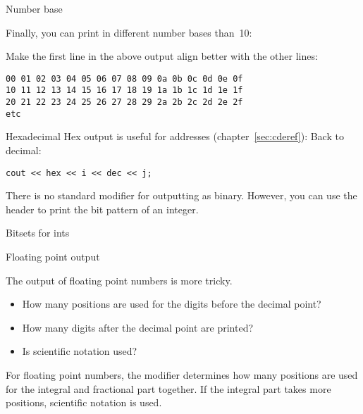 \begin{block}{Number base}
  \label{sl:io-base}
  \advance\textwidth -2in 

  Finally, you can print in different number bases than~10:

  \def\snippetcodefraction{.4}
  \def\snippetanswfraction{.6}
  \def\codesize{\ttfamily\tiny}
  \def\verbsize{\ttfamily\tiny}

\end{block}

\begin{exercise}
  \label{ex:leadzero}
  Make the first line in the above output align better with the other lines:
\begin{verbatim}
00 01 02 03 04 05 06 07 08 09 0a 0b 0c 0d 0e 0f 
10 11 12 13 14 15 16 17 18 19 1a 1b 1c 1d 1e 1f 
20 21 22 23 24 25 26 27 28 29 2a 2b 2c 2d 2e 2f 
etc
\end{verbatim}
\end{exercise}

\begin{block}{Hexadecimal}
  \label{sl:io-hex}
  Hex output is useful for addresses (chapter~\ref{sec:cderef}):
  Back to decimal:
\begin{lstlisting}
cout << hex << i << dec << j;
\end{lstlisting}
\end{block}

There is no standard modifier for outputting as binary.
However, you can use the  header
to print the bit pattern of an integer.

\begin{block}{Bitsets for ints}
\end{block}

 {Floating point output}

The output of floating point numbers is more tricky.
\begin{itemize}
\item How many positions are used for the digits before the decimal point?
\item How many digits after the decimal point are printed?
\item Is scientific notation used?
\end{itemize}

For floating point numbers, the  modifier
determines how many positions are used for the integral and fractional part
together. If the integral part takes more positions, scientific notation is used.

